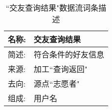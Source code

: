 \begin{table}[H]  
\caption{``交友查询结果"数据流词条描述}  
\begin{center}  
    \begin{tabular}{l p{11cm}} 
        \hline
        \quad 名称:  &   交友查询结果 \\
        \hline
        \quad 简述:  & 符合条件的好友信息 \\
        \hline
        \quad 来源:  & 加工``查询返回"\\
        \hline
        \quad 去向:  & 源点``志愿者" \\
        \hline
        \quad 组成:  & 用户名\\
        \hline
    \end{tabular}
    \label{tab1}
\end{center}
\end{table}
